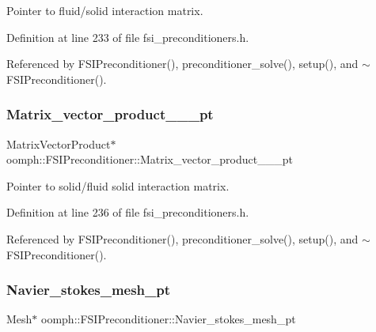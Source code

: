 Pointer to fluid/solid interaction matrix. 



Definition at line 233 of file fsi\+\_\+preconditioners.\+h.



Referenced by F\+S\+I\+Preconditioner(), preconditioner\+\_\+solve(), setup(), and $\sim$\+F\+S\+I\+Preconditioner().

\mbox{\label{classoomph_1_1FSIPreconditioner_a8b4161c521cb4160ae07bb0096eaca1c}} 
\subsubsection{\texorpdfstring{Matrix\+\_\+vector\+\_\+product\+\_\+\_\+\_\+pt}{Matrix\_vector\_product\_1\_0\_pt}}
{\footnotesize\ttfamily Matrix\+Vector\+Product$\ast$ oomph\+::\+F\+S\+I\+Preconditioner\+::\+Matrix\+\_\+vector\+\_\+product\+\_\+\_\+\_\+pt\hspace{0.3cm}{\ttfamily [private]}}



Pointer to solid/fluid solid interaction matrix. 



Definition at line 236 of file fsi\+\_\+preconditioners.\+h.



Referenced by F\+S\+I\+Preconditioner(), preconditioner\+\_\+solve(), setup(), and $\sim$\+F\+S\+I\+Preconditioner().

\mbox{\label{classoomph_1_1FSIPreconditioner_a201e3fcf3e13bd19b3871e9d3a734a1d}} 
\subsubsection{\texorpdfstring{Navier\+\_\+stokes\+\_\+mesh\+\_\+pt}{Navier\_stokes\_mesh\_pt}}
{\footnotesize\ttfamily Mesh$\ast$ oomph\+::\+F\+S\+I\+Preconditioner\+::\+Navier\+\_\+stokes\+\_\+mesh\+\_\+pt\hspace{0.3cm}{\ttfamily [private]}}



